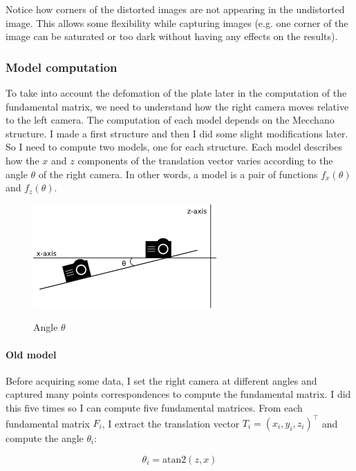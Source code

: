 \documentclass[12pt]{article}
\begin{document}
Notice how corners of the distorted images are not appearing in the undistorted image. This allows some flexibility while capturing images (e.g. one corner of the image can be saturated or too dark without having any effects on the results).


\subsubsection{Model computation}

To take into account the defomation of the plate later in the computation of the fundamental matrix, we need to understand how the right camera moves relative to the left camera. The computation of each model depends on the Mecchano structure. I made a first structure and then I did some slight modifications later. So I need to compute two models, one for each structure. Each model describes how the $x$ and $z$ components of the translation vector varies according to the angle $\theta$ of the right camera. In other words, a model is a pair of functions $f_x(\theta)$ and $f_z(\theta)$.

\begin{figure}[H]
    \begin{center}
        \includegraphics[scale=0.4]{images/modeltheta.png} 
        \label{fig:theta}
        \caption{Angle $\theta$}
    \end{center}
\end{figure}

\paragraph{Old model}

Before acquiring some data, I set the right camera at different angles and captured many points correspondences to compute the fundamental matrix. I did this five times so I can compute five fundamental matrices. From each fundamental matrix $F_i$, I extract the translation vector $T_i = (x_i, y_i, z_i)^\top$ and compute the angle $\theta_i$:

\begin{equation}
  \label{eq:theta}
  \theta_i = \text{atan2}(z, x)
\end{equation}
\end{document}
